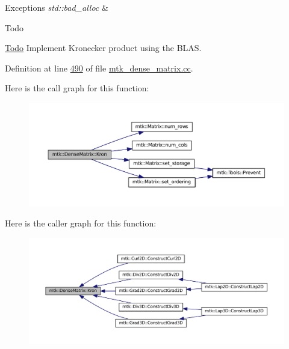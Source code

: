 \begin{DoxyExceptions}{Exceptions}
{\em std\+::bad\+\_\+alloc} & \\
\hline
\end{DoxyExceptions}
\begin{DoxyRefDesc}{Todo}
\item[\hyperlink{todo__todo000001}{Todo}]Implement Kronecker product using the B\+L\+A\+S. \end{DoxyRefDesc}


Definition at line \hyperlink{mtk__dense__matrix_8cc_source_l00490}{490} of file \hyperlink{mtk__dense__matrix_8cc_source}{mtk\+\_\+dense\+\_\+matrix.\+cc}.



Here is the call graph for this function\+:\nopagebreak
\begin{figure}[H]
\begin{center}
\leavevmode
\includegraphics[width=350pt]{classmtk_1_1DenseMatrix_a01d3d8bd502870f93bf3a88a0cc5fb49_cgraph}
\end{center}
\end{figure}




Here is the caller graph for this function\+:\nopagebreak
\begin{figure}[H]
\begin{center}
\leavevmode
\includegraphics[width=350pt]{classmtk_1_1DenseMatrix_a01d3d8bd502870f93bf3a88a0cc5fb49_icgraph}
\end{center}
\end{figure}


